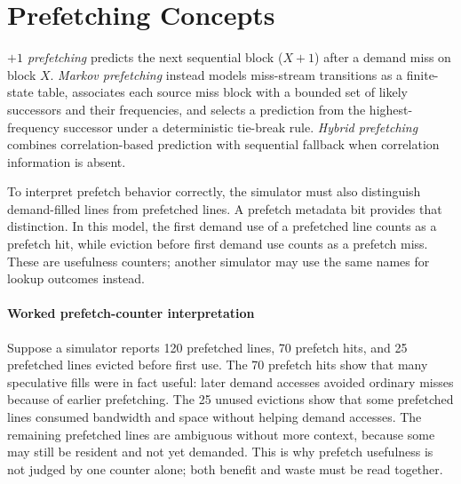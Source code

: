 \section{Prefetching Concepts}\label{sec:auto-052}
\textit{$+1$ prefetching} predicts the next sequential block ($X+1$) after a demand miss on block $X$.
\textit{Markov prefetching} instead models miss-stream transitions as a finite-state table, associates each source miss block with a bounded set of likely successors and their frequencies, and selects a prediction from the highest-frequency successor under a deterministic tie-break rule.
\textit{Hybrid prefetching} combines correlation-based prediction with sequential fallback when correlation information is absent.

To interpret prefetch behavior correctly, the simulator must also distinguish demand-filled lines from prefetched lines.
A prefetch metadata bit provides that distinction.
In this model, the first demand use of a prefetched line counts as a prefetch hit, while eviction before first demand use counts as a prefetch miss.
These are usefulness counters; another simulator may use the same names for lookup outcomes instead.

\paragraph{Worked prefetch-counter interpretation}\label{par:auto-027c}
Suppose a simulator reports 120 prefetched lines, 70 prefetch hits, and 25 prefetched lines evicted before first use.
The 70 prefetch hits show that many speculative fills were in fact useful: later demand accesses avoided ordinary misses because of earlier prefetching.
The 25 unused evictions show that some prefetched lines consumed bandwidth and space without helping demand accesses.
The remaining prefetched lines are ambiguous without more context, because some may still be resident and not yet demanded.
This is why prefetch usefulness is not judged by one counter alone; both benefit and waste must be read together.


